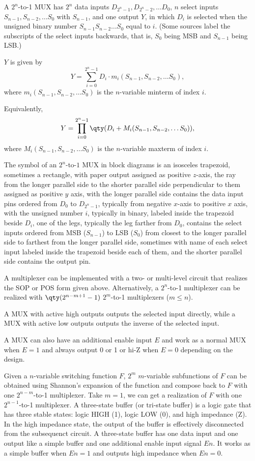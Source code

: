 \documentclass[a4paper,12pt]{report}
\begin{document}
A $2^n$-to-1 MUX has $2^n$ data inputs $D_{2^n-1},D_{2^n-2},\ldots D_0$, $n$ select inputs $S_{n-1},S_{n-2},\ldots S_0$ with $S_{n-1}$, and one output $Y$, in which $D_i$ is selected when the unsigned binary number $S_{n-1}S_{n-2}\ldots S_0$ equal to $i$. (Some sources label the subscripts of the select inputs backwards, that is, $S_0$ being MSB and $S_{n-1}$ being LSB.)

$Y$ is given by
\[Y=\sum_{i=0}^{2^n-1}D_i\cdot m_i(S_{n-1},S_{n-2},\ldots S_0),\]
where $m_i(S_{n-1},S_{n-2},\ldots S_0)$ is the $n$-variable minterm of index $i$.

Equivalently,
\[Y=\prod_{i=0}^{2^n-1}\qty(D_i+M_i(S_{n-1},S_{n-2},\ldots S_0)),\]
where $M_i(S_{n-1},S_{n-2},\ldots S_0)$ is the $n$-variable maxterm of index $i$.

The symbol of an $2^n$-to-$1$ MUX in block diagrams is an isosceles trapezoid, sometimes a rectangle, with paper output assigned as positive $z$-axis, the ray from the longer parallel side to the shorter parallel side perpendicular to them assigned as positive $y$ axis, with the longer parallel side contains the data input pins ordered from $D_0$ to $D_{2^n-1}$, typically from negative $x$-axis to positive $x$ axis, with the unsigned number $i$, typically in binary, labeled inside the trapezoid beside $D_i$, one of the legs, typically the leg farther from $D_0$, contains the select inputs ordered from MSB ($S_{n-1}$) to LSB ($S_0$) from closest to the longer parallel side to farthest from the longer parallel side, sometimes with name of each select input labeled inside the trapezoid beside each of them, and the shorter parallel side contains the output pin.

A multiplexer can be implemented with a two- or multi-level circuit that realizes the SOP or POS form given above. Alternatively, a $2^n$-to-1 multiplexer can be realized with $\qty(2^{n-m+1}-1)$ $2^m$-to-1 multiplexers ($m\leq n$).

A MUX with active high outputs outputs the selected input directly, while a MUX with active low outputs outputs the inverse of the selected input.

A MUX can also have an additional enable input $E$ and work as a normal MUX when $E=1$ and always output 0 or 1 or hi-Z when $E=0$ depending on the design.

Given a $n$-variable switching function $F$, $2^m$ $m$-variable subfunctions of $F$ can be obtained using Shannon's expansion of the function and compose back to $F$ with one $2^{n-m}$-to-1 multiplexer. Take $m=1$, we can get a realization of $F$ with one $2^{n-1}$-to-1 multiplexer.
A three-state buffer (or tri-state buffer) is a logic gate that has three stable states: logic HIGH (1), logic LOW (0), and high impedance (Z). In the high impedance state, the output of the buffer is effectively disconnected from the subsequenct circuit. A three-state buffer has one data input and one output like a simple buffer and one additional enable input signal $En$. It works as a simple buffer when $En=1$ and outputs high impedance when $En=0$.
\end{document}
